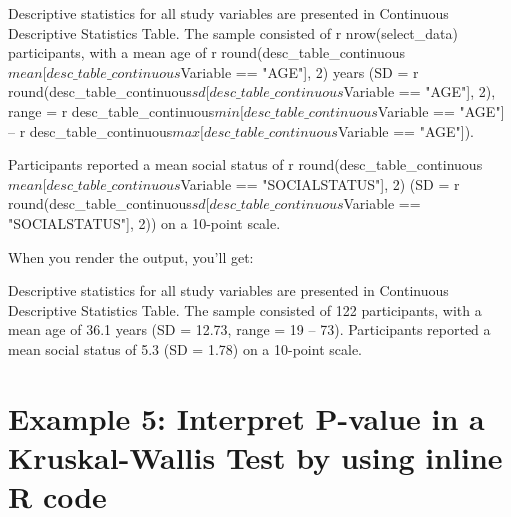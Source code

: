 \documentclass[
  english,
  letterpaper,
  DIV=11,
  numbers=noendperiod]{scrreprt}
\newenvironment{Shaded}{\begin{snugshade}}{\end{snugshade}}
\newcommand{\InformationTok}[1]{\textcolor[rgb]{0.37,0.37,0.37}{#1}}
\newcommand{\NormalTok}[1]{\textcolor[rgb]{0.00,0.23,0.31}{#1}}
\begin{document}
\begin{Shaded}
\begin{Highlighting}[]
\NormalTok{Descriptive statistics for all study variables are presented in Continuous Descriptive Statistics Table. }
\NormalTok{The sample consisted of }\InformationTok{\textasciigrave{}r nrow(select\_data)\textasciigrave{}}\NormalTok{ participants, }
\NormalTok{with a mean age of }\InformationTok{\textasciigrave{}r round(desc\_table\_continuous$mean[desc\_table\_continuous$Variable == "AGE"], 2)\textasciigrave{}} 
\NormalTok{years (SD = }\InformationTok{\textasciigrave{}r round(desc\_table\_continuous$sd[desc\_table\_continuous$Variable == "AGE"], 2)\textasciigrave{}}\NormalTok{, }
\NormalTok{range = }\InformationTok{\textasciigrave{}r desc\_table\_continuous$min[desc\_table\_continuous$Variable == "AGE"]\textasciigrave{}}
\NormalTok{– }\InformationTok{\textasciigrave{}r desc\_table\_continuous$max[desc\_table\_continuous$Variable == "AGE"]\textasciigrave{}}\NormalTok{). }

\NormalTok{Participants reported a mean social status of }
\InformationTok{\textasciigrave{}r round(desc\_table\_continuous$mean[desc\_table\_continuous$Variable == "SOCIALSTATUS"], 2)\textasciigrave{}} 
\NormalTok{(SD = }\InformationTok{\textasciigrave{}r round(desc\_table\_continuous$sd[desc\_table\_continuous$Variable == "SOCIALSTATUS"], 2)\textasciigrave{}}\NormalTok{) on a 10{-}point scale.}
\end{Highlighting}
\end{Shaded}

When you render the output, you'll get:

\begin{Shaded}
\begin{Highlighting}[]
\NormalTok{Descriptive statistics for all study variables are presented in Continuous Descriptive Statistics Table. }
\NormalTok{The sample consisted of 122 participants, with a mean age of 36.1 years (SD = 12.73, range = 19 – 73). }
\NormalTok{Participants reported a mean social status of 5.3 (SD = 1.78) on a 10{-}point scale.}
\end{Highlighting}
\end{Shaded}

\section{Example 5: Interpret P-value in a Kruskal-Wallis Test by using
inline R
code}\label{example-5-interpret-p-value-in-a-kruskal-wallis-test-by-using-inline-r-code}
\end{document}
